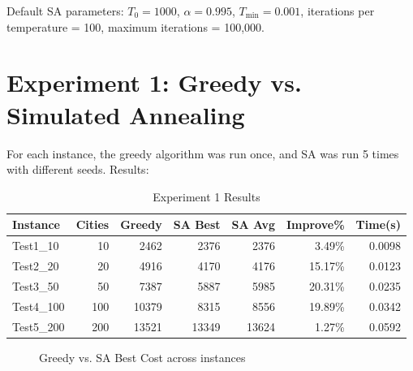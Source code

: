 \documentclass[12pt,a4paper]{article}
\begin{document}
\noindent Default SA parameters: $T_0 = 1000$, $\alpha = 0.995$, $T_{\min} = 0.001$, iterations per temperature = 100, maximum iterations = 100{,}000.

\section{Experiment 1: Greedy vs. Simulated Annealing}

For each instance, the greedy algorithm was run once, and SA was run 5 times with different seeds. Results:

\begin{table}[H]
\centering
\caption{Experiment 1 Results}
\begin{tabular}{@{}lrrrrrr@{}}
\toprule
\textbf{Instance} & \textbf{Cities} & \textbf{Greedy} & \textbf{SA Best} & \textbf{SA Avg} & \textbf{Improve\%} & \textbf{Time(s)} \\
\midrule
Test1\_10 & 10 & 2462 & 2376 & 2376 & 3.49\% & 0.0098 \\
Test2\_20 & 20 & 4916 & 4170 & 4176 & 15.17\% & 0.0123 \\
Test3\_50 & 50 & 7387 & 5887 & 5985 & 20.31\% & 0.0235 \\
Test4\_100 & 100 & 10379 & 8315 & 8556 & 19.89\% & 0.0342 \\
Test5\_200 & 200 & 13521 & 13349 & 13624 & 1.27\% & 0.0592 \\
\bottomrule
\end{tabular}
\end{table}

\begin{figure}[H]
\centering
{}
\caption{Greedy vs. SA Best Cost across instances}
\end{figure}
\end{document}
